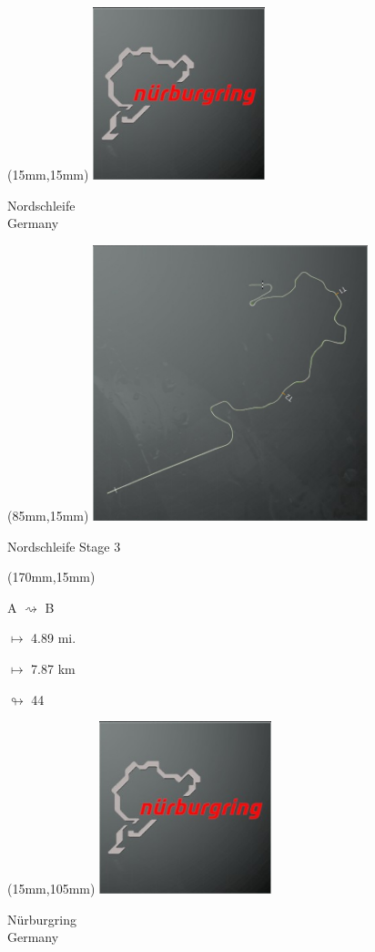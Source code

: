 \begin{textblock*}{60mm}(15mm,15mm)%
\includegraphics[width=50mm]{LG/2015-05-20_00088.png}
\par Nordschleife\\ Germany
\end{textblock*}
\begin{textblock*}{80mm}(85mm,15mm)%
\includegraphics[width=80mm]{TR/2015-05-20_00040.png}
\centerline{Nordschleife Stage 3}
\end{textblock*}
\begin{textblock*}{30mm}(170mm,15mm)%
\par A $\rightsquigarrow$ B
\Large
\par$\mapsto$ 4.89 mi.
\par$\mapsto$ 7.87 km
\par$\looparrowright$ 44
\end{textblock*}
\begin{textblock*}{60mm}(15mm,105mm)%
\includegraphics[width=50mm]{LG/2015-05-20_00089.png}
\par Nürburgring\\ Germany
\end{textblock*}
